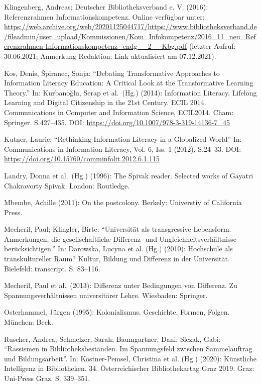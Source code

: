 \documentclass[a4paper,
fontsize=11pt,
oneside,
numbers=noperiodatend,
parskip=half-,
bibliography=totoc,
final
]{scrartcl}
\begin{document}
Klingenberg, Andreas; Deutscher Bibliotheksverband e. V. (2016):
Referenzrahmen Informationskompetenz. Online verfügbar unter:
\href{https://web.archive.org/web/20201125044717/https://www.bibliotheksverband.de/fileadmin/user_upload/Kommissionen/Kom_Infokompetenz/2016_11_neu_Referenzrahmen-Informationskompetenz_endg__2__Kbg.pdf}{https://web.archive.org/web/20201125044717/\linebreak\-https://www.bibliotheksverband.de/fileadmin/user\_upload/Kommissionen/Kom\_Info\linebreak\-kompetenz/2016\_11\_neu\_Referenzrahmen-Informationskompetenz\_endg\_\_2\_\_Kbg.pdf}
(letzter Aufruf: 30.06.2021; Anmerkung Redaktion: Link aktualisiert am
07.12.2021).

Kos, Denis, Špiranec, Sonja: \enquote{Debating Transformative Approaches
to Information Literacy Education: A Critical Look at the Transformative
Learning Theory.} In: Kurbanoğlu, Serap et al.~(Hg.) (2014): Information
Literacy. Lifelong Learning and Digital Citizenship in the 21st Century.
ECIL 2014. Communications in Computer and Information Science, ECIL2014.
Cham: Springer. S.427--435. DOI:
\url{https://doi.org/10.1007/978-3-319-14136-7_45}

Kutner, Laurie: \enquote{Rethinking Information Literacy in a Globalized
World} In: Communications in Information Literacy, Vol. 6, Iss. 1
(2012), S.24--33. DOI:
\url{https://doi.org/10.15760/comminfolit.2012.6.1.115}

Landry, Donna et al.~(Hg.) (1996): The Spivak reader. Selected works of
Gayatri Chakravorty Spivak. London: Routledge.

Mbembe, Achille (2011): On the postcolony. Berkely: Universtiy of
California Press.

Mecheril, Paul; Klingler, Birte: \enquote{Universität als transgressive
Lebensform. Anmerkungen, die gesellschaftliche Differenz- und
Ungleichheitsverhältnisse berücksichtigen.} In: Darowska, Lucyna et al.
(Hg.) (2010): Hochschule als transkultureller Raum? Kultur, Bildung und
Differenz in der Universität. Bielefeld: transcript. S. 83--116.

Mecheril, Paul et al.~(2013): Differenz unter Bedingungen von Differenz.
Zu Spannungsverhältnissen universitärer Lehre. Wiesbaden: Springer.

Osterhammel, Jürgen (1995): Kolonialismus. Geschichte, Formen, Folgen.
München: Beck.

Ruscher, Andrea; Schmelzer, Sarah; Baumgartner, Dani; Slezak, Gabi:
\enquote{Rassismen in Bibliotheksbeständen. Im Spannungsfeld zwischen
Sammelauftrag und Bildungsarbeit}. In: Köstner-Pemsel, Christina et al.
(Hg.) (2020): Künstliche Intelligenz in Bibliotheken. 34.
Österreichischer Bibliothekartag Graz 2019. Graz: Uni-Press Graz. S.
339--351.
\end{document}
